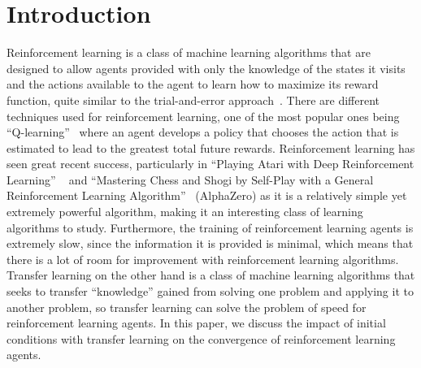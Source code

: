 \documentclass[twocolumn]{article}
\begin{document}
	\section{Introduction} 
	Reinforcement learning is a class of machine learning algorithms that 
	are designed to allow agents provided with only the knowledge of the states 
	it visits and the actions available to the agent to learn how to maximize 
	its reward function, quite similar to the trial-and-error 
	approach~\cite{Kaebling}. There are different techniques used for 
	reinforcement learning, one of the most popular ones being 
	``Q-learning''~\cite{Watkins} where an agent develops a policy that chooses 
	the action that is estimated to lead to the greatest total future rewards. 
	Reinforcement learning has seen great recent success, particularly in 
	``Playing Atari with Deep Reinforcement Learning'' ~\cite{Mnih} and 
	``Mastering Chess and Shogi by Self-Play with a General Reinforcement 
	Learning Algorithm''~\cite{Silver} (AlphaZero) as it is a relatively simple 
	yet extremely powerful algorithm, making it an interesting class of 
	learning algorithms to study. Furthermore, the training of reinforcement 
	learning agents is extremely slow, since the information it is provided is 
	minimal, which means that there is a lot of room for improvement with 
	reinforcement learning algorithms. Transfer learning on the other hand is a 
	class of machine learning algorithms that seeks to transfer ``knowledge'' 
	gained from solving one problem and applying it to another problem, so 
	transfer learning can solve the problem of speed for reinforcement learning 
	agents. In this paper, we discuss the impact of initial conditions with 
	transfer learning on the convergence of reinforcement learning 
	agents.\\	

	
\end{document}
